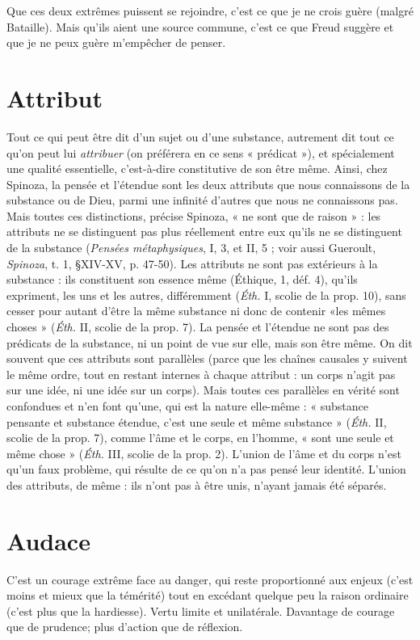 Que ces deux extrêmes puissent se rejoindre, c’est ce que je ne crois guère
(malgré Bataille). Mais qu’ils aient une source commune, c’est ce que Freud
suggère et que je ne peux guère m'empêcher de penser.

\section{Attribut}
Tout ce qui peut être dit d’un sujet ou d’une substance, autrement
dit tout ce qu’on peut lui {\it attribuer} (on préférera en ce
sens « prédicat »), et spécialement une qualité essentielle, c’est-à-dire constitutive
de son être même. Ainsi, chez Spinoza, la pensée et l’étendue sont les deux
attributs que nous connaissons de la substance ou de Dieu, parmi une infinité
d’autres que nous ne connaissons pas. Mais toutes ces distinctions, précise Spinoza,
« ne sont que de raison » : les attributs ne se distinguent pas plus réellement
entre eux qu'ils ne se distinguent de la substance ({\it Pensées métaphysiques},
I, 3, et II, 5 ; voir aussi Gueroult, {\it Spinoza}, t. 1, \S XIV-XV, p. 47-50). Les attributs
ne sont pas extérieurs à la substance : ils constituent son essence même
({\it }Éthique, 1, déf. 4), qu’ils expriment, les uns et les autres, différemment ({\it Éth.} I,
scolie de la prop. 10), sans cesser pour autant d’être la même substance ni donc
de contenir «les mêmes choses » ({\it Éth.} II, scolie de la prop. 7). La pensée et
l'étendue ne sont pas des prédicats de la substance, ni un point de vue sur elle,
mais son être même. On dit souvent que ces attributs sont parallèles (parce que
les chaînes causales y suivent le même ordre, tout en restant internes à chaque
attribut : un corps n’agit pas sur une idée, ni une idée sur un corps). Mais
toutes ces parallèles en vérité sont confondues et n’en font qu’une, qui est la
nature elle-même : « substance pensante et substance étendue, c’est une seule et
même substance » ({\it Éth.} II, scolie de la prop. 7), comme l’âme et le corps, en
l’homme, « sont une seule et même chose » ({\it Éth.} III, scolie de la prop. 2).
L'union de l’âme et du corps n’est qu’un faux problème, qui résulte de ce qu'on
n’a pas pensé leur identité. L'union des attributs, de même : ils n’ont pas à être
unis, n’ayant jamais été séparés.

\section{Audace}
C'est un courage extrême face au danger, qui reste proportionné
aux enjeux (c’est moins et mieux que la témérité) tout en excédant
quelque peu la raison ordinaire (c’est plus que la hardiesse). Vertu limite et unilatérale.
Davantage de courage que de prudence; plus d’action que de
réflexion.

